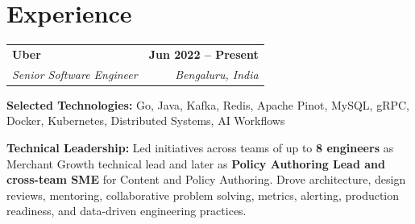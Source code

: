 \documentclass[10pt,a4paper]{article}
\makeatletter
\newcommand{\company}[4]{%
    \begin{tabularx}{\textwidth}{@{}Xr@{}}
        {\large\textbf{#1}} &
        {\small\textbf{#3}} \\[2pt]

        {\textit{\color{secondary}#2}} &
        {\small\textit{\color{secondary}#4}}
    \end{tabularx}
    \vspace{5pt}
}
\makeatother
\begin{document}
\section{Experience}


\company
{Uber}
{Senior Software Engineer}
{Jun 2022 -- Present}
{Bengaluru, India}

{\small
\textbf{Selected Technologies:}
Go, Java, Kafka, Redis, Apache Pinot, MySQL, gRPC,
Docker, Kubernetes, Distributed Systems, AI Workflows
}

\vspace{7pt}

\textbf{Technical Leadership:}
Led initiatives across teams of up to \textbf{8 engineers} as Merchant Growth
technical lead and later as \textbf{Policy Authoring Lead and cross-team SME}
for Content and Policy Authoring. Drove architecture, design reviews,
mentoring, collaborative problem solving, metrics, alerting, production
readiness, and data-driven engineering practices.

\vspace{6pt}
\end{document}
